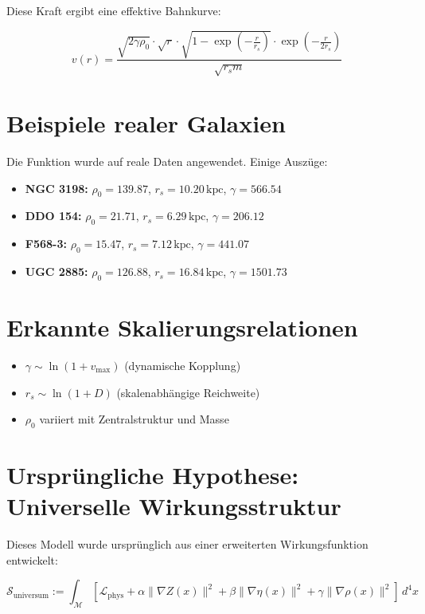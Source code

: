 \documentclass[11pt]{article}
\begin{document}
Diese Kraft ergibt eine effektive Bahnkurve:

\[
v(r) = \frac{\sqrt{2 \gamma \rho_0} \cdot \sqrt{r} \cdot \sqrt{1 - \exp(-\frac{r}{r_s})} \cdot \exp(-\frac{r}{2r_s})}{\sqrt{r_s m}}
\]

\section*{Beispiele realer Galaxien}

Die Funktion wurde auf reale Daten angewendet. Einige Auszüge:

\begin{itemize}
  \item \textbf{NGC 3198:} $\rho_0 = 139.87$, $r_s = 10.20\,\mathrm{kpc}$, $\gamma = 566.54$
  \item \textbf{DDO 154:} $\rho_0 = 21.71$, $r_s = 6.29\,\mathrm{kpc}$, $\gamma = 206.12$
  \item \textbf{F568-3:} $\rho_0 = 15.47$, $r_s = 7.12\,\mathrm{kpc}$, $\gamma = 441.07$
  \item \textbf{UGC 2885:} $\rho_0 = 126.88$, $r_s = 16.84\,\mathrm{kpc}$, $\gamma = 1501.73$
\end{itemize}

\section*{Erkannte Skalierungsrelationen}

\begin{itemize}
  \item $\gamma \sim \ln(1 + v_{\text{max}})$ (dynamische Kopplung)
  \item $r_s \sim \ln(1 + D)$ (skalenabhängige Reichweite)
  \item $\rho_0$ variiert mit Zentralstruktur und Masse
\end{itemize}

\section*{Ursprüngliche Hypothese: Universelle Wirkungsstruktur}


Dieses Modell wurde ursprünglich aus einer erweiterten Wirkungsfunktion entwickelt:

\[
\mathcal{S}_{\text{universum}} := \int_{\mathcal{M}} \left[
\mathcal{L}_{\text{phys}} + \alpha \|\nabla Z(x)\|^2 + \beta \|\nabla \eta(x)\|^2 + \gamma \|\nabla \rho(x)\|^2
\right] \, d^4x
\]
\end{document}
